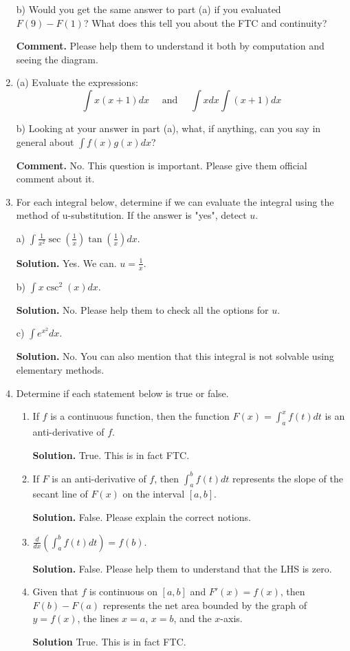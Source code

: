 \documentclass[12pt]{article}
\begin{document}
\begin{enumerate}
b) Would you get the same answer to part (a) if you evaluated $F(9) -  F(1)$? What does
this tell you about the FTC and continuity?

\textbf{Comment.  } Please help them to understand it both by computation and seeing the diagram.

\item (a) Evaluate the expressions:
$$\int x(x+1)dx \quad \text{ and }\quad \int xdx \int (x+1)dx$$

b) Looking at your answer in part (a), what, if anything, can you say in general about $\int f(x)g(x)dx$?

\textbf{Comment. } No. This question is important. Please give them official comment about it. 

\item For each integral below, determine if we can evaluate the integral using the method of
u-substitution. If the answer is "yes", detect $u$.

a) $\int \frac{1}{x^2}\sec(\frac{1}{x})\tan(\frac{1}{x})dx.$

\textbf{Solution.} Yes. We can.  $u = \frac{1}{x}$.

b) $\int x\csc^2(x)dx$.

\textbf{Solution.} No. Please help them to check all the options for $u$.

c) $\int e^{x^2}dx$.

\textbf{Solution. } No. You can also mention that this integral is not solvable using elementary methods. 

\item Determine if each statement below is true or false.

\begin{enumerate}

\item If $f$ is a continuous function, then the function $F(x) = \int_a ^x f(t)dt$ is an anti-derivative
of $f$.

\textbf{Solution.} True.  This is in fact  FTC.

\item If $F$ is an anti-derivative of $f$, then $\int_a^b f(t)dt$ represents the slope of the secant line of
$F(x)$ on the interval $[a, b]$.

\textbf{Solution. } False. Please explain the correct notions.

\item $\frac{d}{dx}\left(\int_{a}^b f(t)dt\right) = f(b)$.

\textbf{Solution. } False. Please help them to understand that the LHS is zero. 

\item Given that $f$ is continuous on $[a, b]$ and $F'(x) = f(x)$, then $F(b) - F(a)$ represents the
net area bounded by the graph of $y = f(x)$, the lines $x = a$, $x = b$, and the $x$-axis.

\textbf{Solution} True. This is in fact FTC.
\end{enumerate}


\end{enumerate}
\end{document}
